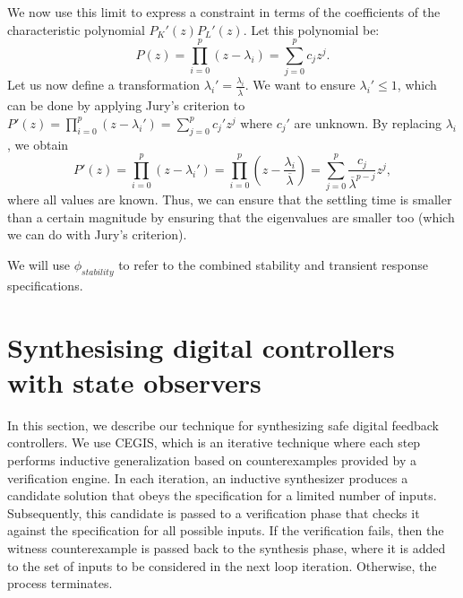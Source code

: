 \documentclass[a4paper,UKenglish]{lipics-v2018}
\begin{document}
%
We now use this limit to express a constraint in terms of the
coefficients of the characteristic polynomial $P_K'(z)P_L'(z)$.
Let this polynomial be:
%
\begin{equation}
P(z)=\prod_{i=0}^p (z-\lambda_i)=\sum_{j=0}^p c_jz^j.
\end{equation}
%
Let us now define a
transformation $\lambda_i'=\frac{\lambda_i}{\overline{\lambda}}$.  We want
to ensure $\lambda_i' \leq 1$, which can be done by applying Jury's criterion
to $P'(z)=\prod_{i=0}^p (z-\lambda_i')=\sum_{j=0}^p c_j'z^j$ where $c_j'$ are
unknown.  By replacing $\lambda_i$, we obtain
%
\begin{equation}
P'(z)=\prod_{i=0}^p (z-\lambda_i')=\prod_{i=0}^p \left(z-\frac{\lambda_i}{\overline{\lambda}}\right)=\sum_{j=0}^p \frac{c_j}{\overline{\lambda}^{p-j}}z^j, 
\end{equation}
%
where all values are known.  Thus, we can ensure that the settling time is
smaller than a certain magnitude by ensuring that the eigenvalues are
smaller too (which we can do with Jury's criterion).

We will use $\phi_\mathit{stability}$ to refer to the combined stability and
transient response specifications.

\section{Synthesising digital controllers with state observers}\label{sec:dynamic_synth}


In this section, we describe our technique for synthesizing safe digital
feedback controllers.  We use CEGIS, which is an iterative technique where
each step performs inductive generalization based on counterexamples
provided by a verification engine.  In each iteration, an inductive
synthesizer produces a candidate solution that obeys the specification for a
limited number of inputs.  Subsequently, this candidate is passed to a
verification phase that checks it against the specification for all possible
inputs.  If the verification fails, then the witness counterexample is
passed back to the synthesis phase, where it is added to the set of inputs
to be considered in the next loop iteration.  Otherwise, the process
terminates.
\end{document}
